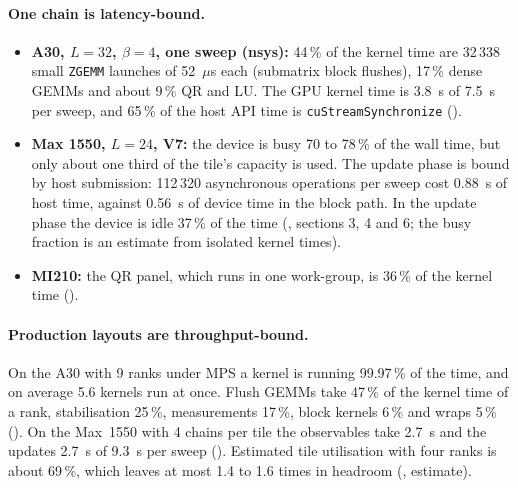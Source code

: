 \paragraph{One chain is latency-bound.}
\begin{itemize}
\item \textbf{A30, $L=32$, $\beta=4$, one sweep (nsys):} 44\,\% of the kernel time are 32\,338 small \texttt{ZGEMM} launches of 52~$\mu$s each (submatrix block flushes), 17\,\% dense GEMMs and about 9\,\% QR and LU. The GPU kernel time is 3.8~s of 7.5~s per sweep, and 65\,\% of the host API time is \texttt{cuStreamSynchronize} ().
\item \textbf{Max 1550, $L=24$, V7:} the device is busy 70 to 78\,\% of the wall time, but only about one third of the tile's capacity is used. The update phase is bound by host submission: 112\,320 asynchronous operations per sweep cost 0.88~s of host time, against 0.56~s of device time in the block path. In the update phase the device is idle 37\,\% of the time (, sections 3, 4 and 6; the busy fraction is an estimate from isolated kernel times).
\item \textbf{MI210:} the QR panel, which runs in one work-group, is 36\,\% of the kernel time ().
\end{itemize}

\paragraph{Production layouts are throughput-bound.} On the A30 with 9 ranks under MPS a kernel is running 99.97\,\% of the time, and on average 5.6 kernels run at once. Flush GEMMs take 47\,\% of the kernel time of a rank, stabilisation 25\,\%, measurements 17\,\%, block kernels 6\,\% and wraps 5\,\% (). On the Max~1550 with 4 chains per tile the observables take 2.7~s and the updates 2.7~s of 9.3~s per sweep (). Estimated tile utilisation with four ranks is about 69\,\%, which leaves at most 1.4 to 1.6 times in headroom (, estimate).


